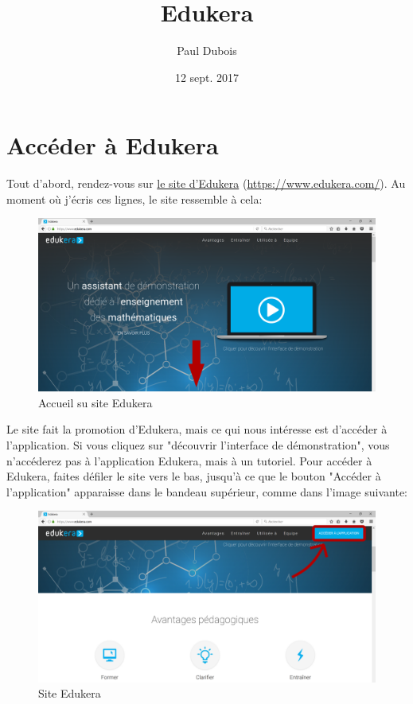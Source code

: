 \documentclass[a4paper]{article}
\title{Edukera}
\author{Paul Dubois}
\date{12 sept. 2017}
\begin{document}
\maketitle



\tableofcontents



\section{Accéder à Edukera}



Tout d'abord, rendez-vous sur \href{https://www.edukera.com/}{le site d'Edukera} (\url{https://www.edukera.com/}).
Au moment où j'écris ces lignes, le site ressemble à cela:
\begin{figure}[h!]
\begin{center}
\includegraphics[scale=0.1]{img_site0.png}
\end{center}
\caption{Accueil su site Edukera}\label{im:site_edukera_haut}
\end{figure}
\FloatBarrier

Le site fait la promotion d'Edukera, mais ce qui nous intéresse est d'accéder à l'application. Si vous cliquez sur "découvrir l'interface de démonstration", vous n'accéderez pas à l'application Edukera, mais à un tutoriel. Pour accéder à Edukera, faites défiler le site vers le bas, jusqu'à ce que le bouton "Accéder à l'application" apparaisse dans le bandeau supérieur, comme dans l'image suivante:
\begin{figure}[h!]
\begin{center}
\includegraphics[scale=0.1]{img_site1.png}
\end{center}
\caption{Site Edukera}\label{im:site_edukera_bas}
\end{figure}
\FloatBarrier
\end{document}
